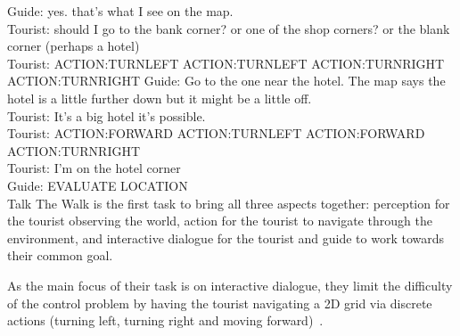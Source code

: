 Guide: yes. that’s what I see on the map. \\
Tourist: should I go to the bank corner? or one of the shop corners? or the blank corner (perhaps a hotel) \\
Tourist: ACTION:TURNLEFT ACTION:TURNLEFT ACTION:TURNRIGHT ACTION:TURNRIGHT Guide: Go to the one near the hotel. The map says the hotel is a little further down but it might be a little off. \\
Tourist: It’s a big hotel it’s possible. \\
Tourist: ACTION:FORWARD ACTION:TURNLEFT ACTION:FORWARD ACTION:TURNRIGHT\\ Tourist: I’m on the hotel corner \\
Guide: EVALUATE LOCATION\\

Talk The Walk is the first task to bring all three aspects together: perception for the tourist observing the world, action for the tourist to navigate through the environment, and interactive dialogue for the tourist and guide to work towards their common goal.

As the main focus of their task is on interactive dialogue, they limit the difficulty of the control problem by having the tourist navigating a 2D grid via discrete actions (turning left, turning right and moving forward)~\cite{DBLP:journals/corr/abs-1807-03367}.
 
 